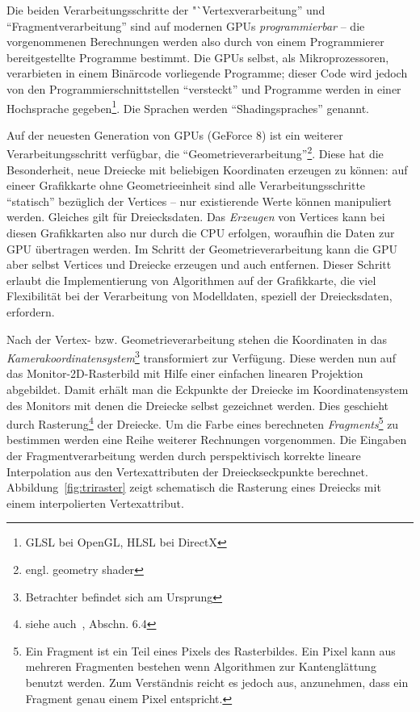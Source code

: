 \documentclass[twoside,a4paper,fleqn,12pt]{book}
\begin{document}
Die beiden Verarbeitungsschritte der "`Vertexverarbeitung'' und "`Fragmentverarbeitung"' sind auf modernen GPUs
\emph{programmierbar} -- die vorgenommenen Berechnungen werden also durch von einem Programmierer bereitgestellte
Programme bestimmt. Die GPUs selbst, als Mikroprozessoren, verarbieten in einem Binärcode vorliegende Programme; dieser Code
wird jedoch von den Programmierschnittstellen "`versteckt"' und Programme werden in einer Hochsprache gegeben\footnote{GLSL bei OpenGL, HLSL bei DirectX}.
Die Sprachen werden "`\glspl{Shadingsprache}"' genannt.

Auf der neuesten Generation von GPUs (GeForce 8) %
ist ein weiterer Verarbeitungsschritt verfügbar, die "`Geometrieverarbeitung"'\footnote{engl. geometry shader}. 
Diese hat die Besonderheit, neue Dreiecke
mit beliebigen Koordinaten erzeugen zu können: 
auf eineer Grafikkarte ohne Geometrieeinheit sind alle Verarbeitungsschritte "`statisch"' bezüglich der Vertices -- nur existierende
Werte können manipuliert werden. Gleiches gilt für Dreiecksdaten. Das \emph{Erzeugen} von Vertices kann bei diesen Grafikkarten
also nur durch die CPU erfolgen, woraufhin die Daten zur GPU übertragen werden.
Im Schritt der Geometrieverarbeitung kann die GPU aber selbst Vertices und Dreiecke erzeugen
und auch entfernen. Dieser Schritt erlaubt die Implementierung von Algorithmen auf der Grafikkarte, die viel 
Flexibilität bei der Verarbeitung von Modelldaten, speziell der Dreiecksdaten, erfordern.

\label{rasterung}
Nach der Vertex- bzw. Geometrieverarbeitung stehen die Koordinaten in das \emph{Kamerakoordinatensystem}\footnote{Betrachter befindet sich am
Ursprung} transformiert zur Verfügung. Diese werden nun auf das Monitor-2D-Rasterbild mit Hilfe einer einfachen linearen Projektion
abgebildet. Damit erhält man die Eckpunkte der Dreiecke im Koordinatensystem des Monitors mit denen die Dreiecke selbst
gezeichnet werden. Dies geschieht durch Rasterung\footnote{siehe auch~\cite{watt_de}, Abschn. 6.4} der Dreiecke. Um die Farbe eines berechneten 
\emph{\gls{Fragment}s}\footnote{Ein Fragment ist ein Teil eines Pixels des Rasterbildes. Ein Pixel kann aus mehreren Fragmenten bestehen wenn 
Algorithmen zur Kantenglättung benutzt werden. Zum Verständnis reicht es jedoch aus, anzunehmen, dass ein Fragment genau einem Pixel entspricht.} zu 
bestimmen werden eine Reihe weiterer Rechnungen vorgenommen. Die Eingaben der Fragmentverarbeitung werden
durch perspektivisch korrekte lineare Interpolation aus den Vertexattributen der Drei\-ecks\-eck\-punk\-te  
berechnet. Abbildung~\ref{fig:triraster} zeigt schematisch die Rasterung eines Dreiecks mit einem interpolierten Vertexattribut.
\end{document}
